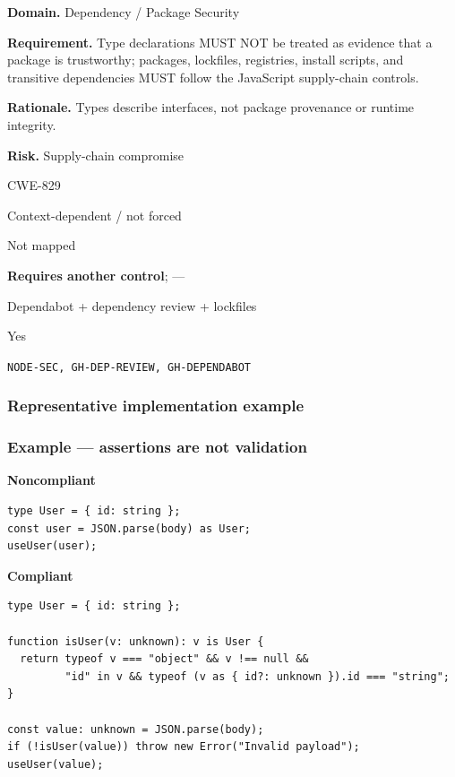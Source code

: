 \documentclass[10pt,letterpaper]{article}
\newcommand{\prioritybadge}[2]{\tcbox[on line,boxrule=0pt,arc=1.2mm,boxsep=0.7mm,left=1mm,right=1mm,top=0.4mm,bottom=0.4mm,colback=#2!12,coltext=#2]{\scriptsize\bfseries #1}}
\begin{document}
\begin{rulebox}[title={\texttt{SCS-TS-DEP-001} \hfill \prioritybadge{Critical Control}{Critical}}]
\textbf{Domain.} Dependency / Package Security

\textbf{Requirement.} Type declarations MUST NOT be treated as evidence that a package is trustworthy; packages, lockfiles, registries, install scripts, and transitive dependencies MUST follow the JavaScript supply-chain controls.

\textbf{Rationale.} Types describe interfaces, not package provenance or runtime integrity.

\textbf{Risk.} Supply-chain compromise

\begin{description}[leftmargin=2.65cm,labelwidth=2.3cm,style=nextline,itemsep=1pt,topsep=3pt]
  \item[CWE] CWE-829
  \item[OWASP] Context-dependent / not forced
  \item[CERT] Not mapped
  \item[CodeQL] \textbf{Requires another control}; ---
  \item[Enforcement] Dependabot + dependency review + lockfiles
  \item[Automation] Yes
  \item[Sources] \texttt{NODE-SEC, GH-DEP-REVIEW, GH-DEPENDABOT}
\end{description}
\end{rulebox}
\subsubsection*{Representative implementation example}
\subsubsection*{Example --- assertions are not validation}

\textbf{Noncompliant}\par
\begin{lstlisting}
type User = { id: string };
const user = JSON.parse(body) as User;
useUser(user);
\end{lstlisting}

\textbf{Compliant}\par
\begin{lstlisting}
type User = { id: string };

function isUser(v: unknown): v is User {
  return typeof v === "object" && v !== null &&
         "id" in v && typeof (v as { id?: unknown }).id === "string";
}

const value: unknown = JSON.parse(body);
if (!isUser(value)) throw new Error("Invalid payload");
useUser(value);
\end{lstlisting}
\end{document}

